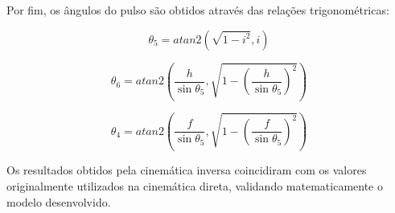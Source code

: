 Por fim, os ângulos do pulso são obtidos através das relações trigonométricas:

\begin{equation}
\theta_5 = atan2(\sqrt{1-i^2}, i)
\end{equation}

\begin{equation}
\theta_6 =
atan2
\left(
\frac{h}{\sin\theta_5},
\sqrt{1-\left(\frac{h}{\sin\theta_5}\right)^2}
\right)
\end{equation}

\begin{equation}
\theta_4 =
atan2
\left(
\frac{f}{\sin\theta_5},
\sqrt{1-\left(\frac{f}{\sin\theta_5}\right)^2}
\right)
\end{equation}

Os resultados obtidos pela cinemática inversa coincidiram com os valores originalmente utilizados na cinemática direta, validando matematicamente o modelo desenvolvido.